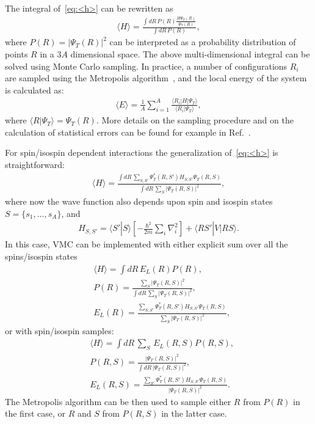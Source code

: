\documentclass[aps,prc,twocolumn,superscriptaddress,floatfix]{revtex4-1}
\begin{document}
The integral of~\cref{eq:<h>} can be rewritten as
\begin{align}
\langle H\rangle=\frac{\displaystyle\int dR\,P(R) \frac{H\Psi_T(R)}{\Psi_T(R)}}{\displaystyle\int dR\,P(R)} ,
\end{align}
where $P(R)=|\Psi_T(R)|^2$ can be interpreted as a probability distribution of points $R$ in a $3A$ 
dimensional space.
The above multi-dimensional integral can be solved using Monte Carlo sampling.
In practice, a number of configurations $R_i$ are sampled using the Metropolis algorithm~\cite{Metropolis:1953}, 
and the local energy of the system is calculated as:
\begin{align}
\langle E\rangle=\frac{1}{A}\sum_{i=1}^A \frac{\langle R_i|H|\Psi_T\rangle}{\langle R_i|\Psi_T\rangle} ,
\end{align}
where $\langle R|\Psi_T\rangle=\Psi_T(R)$.
More details on the sampling procedure and on the calculation of statistical errors can be found 
for example in Ref.~\cite{Ceperley:1995}.

For spin/isospin dependent interactions the generalization of~\cref{eq:<h>} is straightforward:
\begin{align}
\langle H\rangle=\frac{\displaystyle\int dR\,\sum_{S,S'}\Psi_T^*(R,S')H_{S,S'}\Psi_T(R,S)}
{\displaystyle\int dR\,\sum_S|\Psi_T(R,S)|^2} ,
\end{align}
where now the wave function also depends upon spin and isospin states $S=\{s_1,\dots,s_A\}$, and
\begin{align}
H_{S,S'}=\langle S'|S\rangle\left[-\frac{\hbar^2}{2m}\sum_i\nabla_i^2\right]+\langle RS'|V|RS\rangle .
\end{align}
In this case, VMC can be implemented with either explicit sum over all the spins/isospin states
\begin{align}
&\langle H\rangle=\displaystyle\int dR\,E_L(R)P(R) ,\nonumber \\
&P(R)=\frac{\sum_S|\Psi_T(R,S)|^2}{\displaystyle\int dR\,\sum_S|\Psi_T(R,S)|^2} ,\nonumber \\
&E_L(R)=\frac{\sum_{S,S'}\Psi_T^*(R,S')H_{S,S'}\Psi_T(R,S)}{\sum_S|\Psi_T(R,S)|^2} ,
\end{align}
or with spin/isospin samples:
\begin{align}
&\langle H\rangle=\displaystyle\int dR\,\sum_S\,E_L(R,S)P(R,S) ,\nonumber \\
&P(R,S)=\frac{|\Psi_T(R,S)|^2}{\displaystyle\int dR\,|\Psi_T(R,S)|^2} ,\nonumber \\
&E_L(R,S)=\frac{\sum_{S'}\Psi_T^*(R,S')H_{S,S'}\Psi_T(R,S)}{|\Psi_T(R,S)|^2} .
\end{align}
The Metropolis algorithm can be then used to sample either $R$ from $P(R)$ in the first case, 
or $R$ and $S$ from $P(R,S)$ in the latter case.
\end{document}
